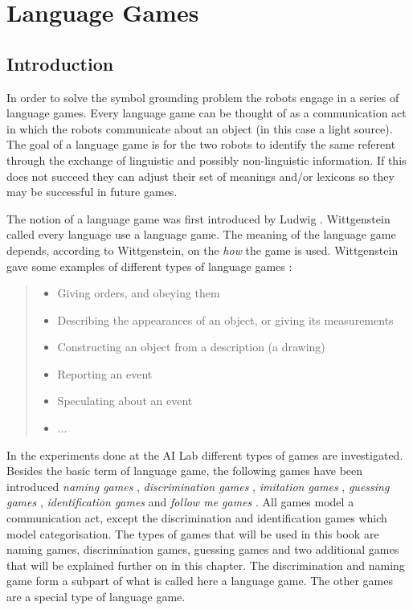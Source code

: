 \chapter{Language Games}\label{ch:lg}\label{ch:cm}

\section{Introduction}

In order to solve the symbol grounding problem the robots engage in a series of language games. Every language game can be thought of as a communication act in which the robots communicate about an object (in this case a light source). The goal of a language game is for the two robots to identify the same referent through the exchange of linguistic and possibly non-linguistic information. If this does not succeed they can adjust their set of meanings and/or lexicons so they may be successful in future games.


The notion of a language game was first introduced by Ludwig \citet{wittgenstein:1958}. Wittgenstein called every language use a language game. The meaning of the language game depends, according to Wittgenstein, on the {\em how} the game is used. Wittgenstein gave some examples of different types of language games \cite[p. 11, par. 22]{wittgenstein:1958}:

\begin{quote}
\begin{itemize}
\item Giving orders, and obeying them
\item Describing the appearances of an object, or giving its measurements
\item Constructing an object from a description (a drawing)
\item Reporting an event
\item Speculating about an event
\item ... 
\end{itemize}
\end{quote}

In the experiments done at the AI Lab different types of games are investigated. Besides the basic term of language game, the following games have been introduced {\em naming games} \citep{steels:1996a}, {\em discrimination games} \citep{steels:1996b}, {\em imitation games} \citep{deboer:1997}, {\em guessing games} \citep{steelskaplan:1999}, {\em identification games} and {\em follow me games} \citep{vogt:1999a,vogt:2000}. All games model a communication act, except the discrimination and identification games which model categorisation. The types of games that will be used in this book are naming games, discrimination games, guessing games and two additional games that will be explained further on in this chapter. The discrimination and naming game form a subpart of what is called here a language game. The other games are a special type of language game.

